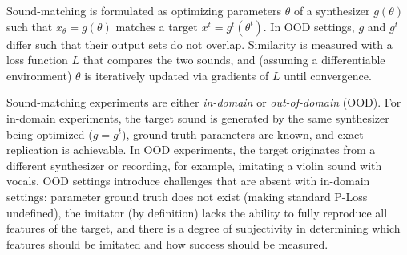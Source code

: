 \documentclass{article}
\begin{document}
Sound-matching is formulated as optimizing parameters $\theta$ of a synthesizer $g(\theta)$ such that $x_\theta = g(\theta)$ matches a target $x^t = g^t(\theta^t)$. In OOD settings, $g$ and $g^t$ differ such that their output sets do not overlap. Similarity is measured with a loss function $L$ that compares the two sounds, and (assuming a differentiable environment) $\theta$ is iteratively updated via gradients of $L$ until convergence.


Sound-matching experiments are either \emph{in-domain} or \emph{out-of-domain} (OOD). For in-domain experiments, the target sound is generated by the same synthesizer being optimized ($g = g^{t}$), ground-truth parameters are known, and exact replication is achievable. In OOD experiments, the target originates from a different synthesizer or recording, for example, imitating a violin sound with vocals. OOD settings introduce challenges that are absent with in-domain settings: parameter ground truth does not exist (making standard P-Loss undefined), the imitator (by definition) lacks the ability to fully reproduce all features of the target, and there is a degree of subjectivity in determining which features should be imitated and how success should be measured. 
\end{document}
